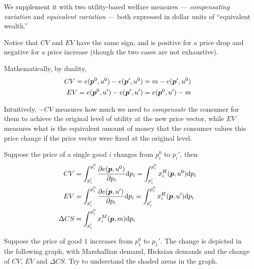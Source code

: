We supplement it with two utility-based welfare measures —
\emph{compensating variation} and \emph{equivalent variation} — both
expressed in dollar units of ``equivalent wealth.''


Notice that \(CV\) and \(EV\) have the same sign, and is positive for
  a price drop and negative for a price increase (though the two cases
  are not exhaustive).

Mathematically, by duality,
  $$
\begin{aligned}
  CV = e(\bm p^0,u^0) - e(\bm p',u^0) = m-e(\bm p',u^0)\\
  EV = e(\bm p^0,u')-e(\bm p',u') = e(\bm p^0,u')-m
  \end{aligned}
$$

Intuitively, \(-CV\) measures how much we need to \emph{compensate}
  the consumer for them to achieve the original level of utility at the
  new price vector, while \(EV\) measures what is the equivalent amount
  of money that the consumer values this price change if the price
  vector were fixed at the original level.

Suppose the price of a single good \(i\) changes from \(p_i^0\) to
\(p_i'\), then
$$
\begin{aligned}
 CV & = \int_{p_i'}^{p_i^0} \frac{\partial e(\bm p,u^0)}{\partial p_i}\text dp_i = \int_{p_i'}^{p_i^0} x_i^H(\bm p,u^0) \text dp_i\\
 EV & = \int_{p_i'}^{p_i^0} \frac{\partial e(\bm p,u')}{\partial p_i}\text dp_i = \int_{p_i'}^{p_i^0} x_i^H(\bm p,u') \text dp_i\\
 \Delta CS & = \int_{p_i'}^{p_i^0} x_i^M(\bm p,m)\text dp_i
\end{aligned}
$$

Suppose the price of good \(1\) increases from \(p_1^0\) to \(p_1'\).
The change is depicted in the following graph, with Marshallian demand, Hicksian demands and the change of $CV$, $EV$ and $\Delta CS$. Try to understand the shaded areas in the graph.

